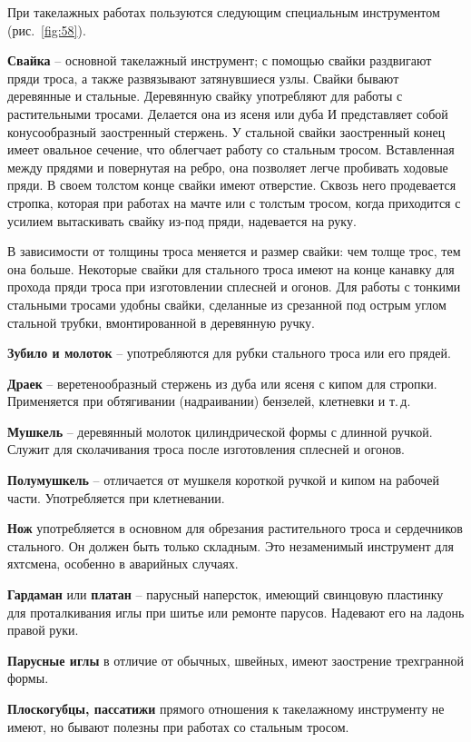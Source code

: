 \documentclass[a4paper, 12pt, twoside, final]{scrbook}
\begin{document}
При такелажных работах пользуются следующим специальным инструментом (рис.~\ref{fig:58}).

\textbf{Свайка} \--- основной такелажный инструмент; с помощью свайки раздвигают пряди троса, а также развязывают затянувшиеся узлы. Свайки бывают деревянные и стальные. Деревянную свайку употребляют для работы с растительными тросами. Делается она из ясеня или дуба И представляет собой конусообразный заостренный стержень. У стальной свайки заостренный конец имеет овальное сечение, что облегчает работу со стальным тросом. Вставленная между прядями и повернутая на ребро, она позволяет легче пробивать ходовые пряди. В своем толстом конце свайки имеют отверстие. Сквозь него продевается стропка, которая при работах на мачте или с толстым тросом, когда приходится с усилием вытаскивать свайку из-под пряди, надевается на руку.

В зависимости от толщины троса меняется и размер свайки: чем толще трос, тем она больше. Некоторые свайки для стального троса имеют на конце канавку для прохода пряди троса при изготовлении сплесней и огонов. Для работы с тонкими стальными тросами удобны свайки, сделанные из срезанной под острым углом стальной трубки, вмонтированной в деревянную ручку.

\textbf{Зубило и молоток} \--- употребляются для рубки стального троса или его прядей.

\textbf{Драек} \--- веретенообразный стержень из дуба или ясеня с кипом для стропки. Применяется при обтягивании (надраивании) бензелей, клетневки и т.\,д.

\textbf{Мушкель} \--- деревянный молоток цилиндрической формы с длинной ручкой. Служит для сколачивания троса после изготовления сплесней и огонов.

\textbf{Полумушкель} \--- отличается от мушкеля короткой ручкой и кипом на рабочей части. Употребляется при клетневании.

\textbf{Нож} употребляется в основном для обрезания растительного троса и сердечников стального. Он должен быть только складным. Это незаменимый инструмент для яхтсмена, особенно в аварийных случаях.

\textbf{Гардаман} или \textbf{платан} \--- парусный наперсток, имеющий свинцовую пластинку для проталкивания иглы при шитье или ремонте парусов. Надевают его на ладонь правой руки.

\textbf{Парусные иглы} в отличие от обычных, швейных, имеют заострение трехгранной формы.

\textbf{Плоскогубцы, пассатижи} прямого отношения к такелажному инструменту не имеют, но бывают полезны при работах со стальным тросом.
\end{document}
